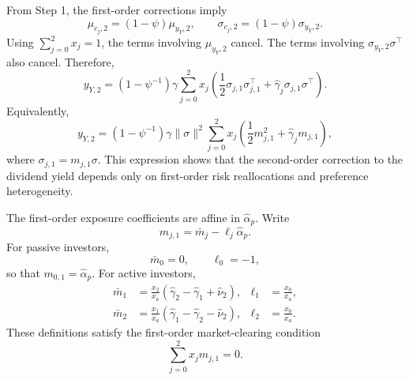 From Step 1, the first-order corrections imply
\begin{equation}
    \mu_{c_j,2}=(1-\psi)\mu_{y_Y,2}, \qquad
    \sigma_{c_j,2}=(1-\psi)\sigma_{y_Y,2}.
\end{equation}
Using $\sum_{j=0}^2 x_j=1$, the terms involving $\mu_{y_Y,2}$ cancel.
The terms involving $\sigma_{y_Y,2}\sigma^\top$ also cancel.
Therefore,
\begin{equation}\label{eq:y2-second-order}
    y_{Y,2}
    = (1-\psi^{-1})\gamma
    \sum_{j=0}^2 x_j \left(
        \frac{1}{2}\sigma_{j,1}\sigma_{j,1}^\top
        + \hat{\gamma}_j \sigma_{j,1}\sigma^\top
    \right).
\end{equation}
Equivalently,
\begin{equation}\label{eq:y2-second-order-scalar-exposure}
    y_{Y,2}
    = (1-\psi^{-1})\gamma\|\sigma\|^2
    \sum_{j=0}^2 x_j \left(
        \frac{1}{2}m_{j,1}^2 + \hat{\gamma}_j m_{j,1}
    \right),
\end{equation}
where $\sigma_{j,1}=m_{j,1}\sigma$.
This expression shows that the second-order correction to the dividend yield depends only on first-order risk reallocations and preference heterogeneity.

The first-order exposure coefficients are affine in $\hat{\alpha}_p$.
Write
\begin{equation}
    m_{j,1}=\bar{m}_j-\ell_j\hat{\alpha}_p.
\end{equation}
For passive investors,
\begin{equation}
    \bar{m}_0=0,
    \qquad
    \ell_0=-1,
\end{equation}
so that $m_{0,1}=\hat{\alpha}_p$.
For active investors,
\begin{align}
    \bar{m}_1 &= \frac{x_2}{x_a}(\hat{\gamma}_2-\hat{\gamma}_1+\hat{\nu}_2),
    &
    \ell_1 &= \frac{x_0}{x_a},\\
    \bar{m}_2 &= \frac{x_1}{x_a}(\hat{\gamma}_1-\hat{\gamma}_2-\hat{\nu}_2),
    &
    \ell_2 &= \frac{x_0}{x_a}.
\end{align}
These definitions satisfy the first-order market-clearing condition
\begin{equation}
    \sum_{j=0}^2 x_j m_{j,1}=0.
\end{equation}


